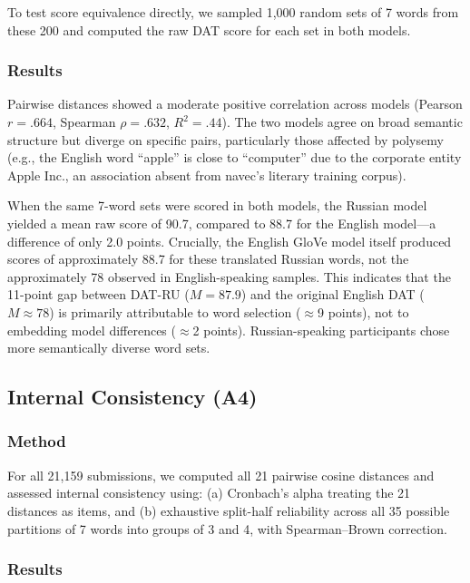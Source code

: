 \documentclass[12pt]{article}
\begin{document}
To test score equivalence directly, we sampled 1,000 random sets of 7 words from these 200 and computed the raw DAT score for each set in both models.

\subsubsection{Results}

Pairwise distances showed a moderate positive correlation across models (Pearson $r = .664$, Spearman $\rho = .632$, $R^2 = .44$). The two models agree on broad semantic structure but diverge on specific pairs, particularly those affected by polysemy (e.g., the English word ``apple'' is close to ``computer'' due to the corporate entity Apple Inc., an association absent from navec's literary training corpus).

When the same 7-word sets were scored in both models, the Russian model yielded a mean raw score of 90.7, compared to 88.7 for the English model---a difference of only 2.0 points. Crucially, the English GloVe model itself produced scores of approximately 88.7 for these translated Russian words, not the approximately 78 observed in English-speaking samples. This indicates that the 11-point gap between DAT-RU ($M = 87.9$) and the original English DAT ($M \approx 78$) is primarily attributable to word selection ($\approx$9 points), not to embedding model differences ($\approx$2 points). Russian-speaking participants chose more semantically diverse word sets.

\subsection{Internal Consistency (A4)}

\subsubsection{Method}

For all 21,159 submissions, we computed all 21 pairwise cosine distances and assessed internal consistency using: (a) Cronbach's alpha treating the 21 distances as items, and (b) exhaustive split-half reliability across all 35 possible partitions of 7 words into groups of 3 and 4, with Spearman--Brown correction.

\subsubsection{Results}
\end{document}
